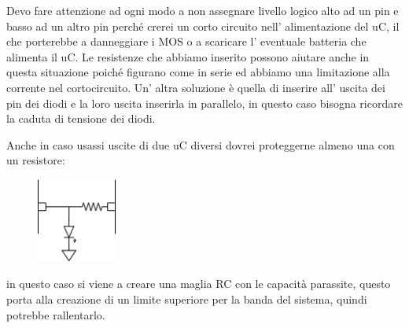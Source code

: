 Devo fare attenzione ad ogni modo a non assegnare livello logico alto ad un pin e basso ad un altro pin perché crerei un corto circuito nell' alimentazione del uC, il che porterebbe a danneggiare i MOS o a scaricare l' eventuale batteria che alimenta il uC.
Le resistenze che abbiamo inserito possono aiutare anche in questa situazione poiché figurano come in serie ed abbiamo una limitazione alla corrente nel cortocircuito.
Un' altra soluzione è quella di inserire all' uscita dei pin dei diodi e la loro uscita inserirla in parallelo, in questo caso bisogna ricordare la caduta di tensione dei diodi.

Anche in caso usassi uscite di due uC diversi dovrei proteggerne almeno una con un resistore:
\begin{figure}[H]
    \centering
    \includegraphics[width=100px]{images/21_GPIO/uscite_uC_diversi_in_parallelo.png}
\end{figure}
in questo caso si viene a creare una maglia RC con le capacità parassite, questo porta alla creazione di un limite superiore per la banda del sistema, quindi potrebbe rallentarlo.

